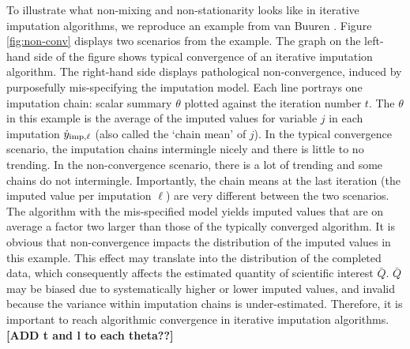 \documentclass[Royal,times,sageh]{sagej}
\begin{document}
To illustrate what non-mixing and non-stationarity looks like in iterative imputation algorithms, we reproduce an example from van Buuren \citeyearpar[\(\S\) 6.5.2]{buur18}. Figure \ref{fig:non-conv} displays two scenarios from the example. The graph on the left-hand side of the figure shows typical convergence of an iterative imputation algorithm. The right-hand side displays pathological non-convergence, induced by purposefully mis-specifying the imputation model. Each line portrays one imputation chain: scalar summary \(\theta\) plotted against the iteration number \(t\). The \(\theta\) in this example is the average of the imputed values for variable \(j\) in each imputation \(\dot y_{\rm imp, \ell}\) (also called the `chain mean' of \(j\)). In the typical convergence scenario, the imputation chains intermingle nicely and there is little to no trending. In the non-convergence scenario, there is a lot of trending and some chains do not intermingle. Importantly, the chain means at the last iteration (the imputed value per imputation \(\ell\)) are very different between the two scenarios. The algorithm with the mis-specified model yields imputed values that are on average a factor two larger than those of the typically converged algorithm. It is obvious that non-convergence impacts the distribution of the imputed values in this example. This effect may translate into the distribution of the completed data, which consequently affects the estimated quantity of scientific interest \(\bar{Q}\). \(\bar{Q}\) may be biased due to systematically higher or lower imputed values, and invalid because the variance within imputation chains is under-estimated. Therefore, it is important to reach algorithmic convergence in iterative imputation algorithms. \textbf{{[}ADD t and l to each theta??{]}}
\end{document}
